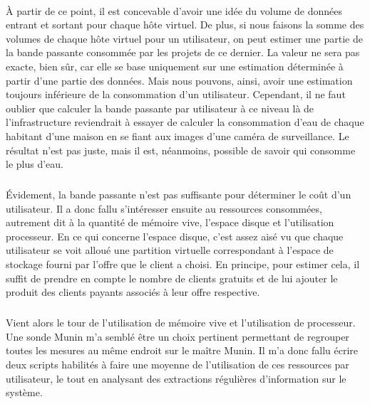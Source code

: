 \documentclass[11pt, a4paper ]{article}
\begin{document}
\begin{spacing}{1.5}
\paragraph{}
À partir de ce point, il est concevable d'avoir une idée du volume de données entrant et sortant pour chaque hôte virtuel. De plus, si nous faisons la somme des volumes de chaque hôte virtuel pour un utilisateur, on peut estimer une partie de la bande passante consommée par les projets de ce dernier. La valeur ne sera pas exacte, bien sûr, car elle se base uniquement sur une estimation déterminée à partir d'une partie des données. Mais nous pouvons, ainsi, avoir une estimation toujours inférieure de la consommation d'un utilisateur. Cependant, il ne faut oublier que calculer la bande passante par utilisateur à ce niveau là de l'infrastructure reviendrait à essayer de calculer la consommation d'eau de chaque habitant d'une maison en se fiant aux images d'une caméra de surveillance. Le résultat n'est pas juste, mais il est, néanmoins, possible de savoir qui consomme le plus d'eau.
\subparagraph{}
Évidement, la bande passante n'est pas suffisante pour déterminer le coût d'un utilisateur. Il a donc fallu s’intéresser ensuite au ressources consommées, autrement dit à la quantité de mémoire vive, l'espace disque et l'utilisation processeur. En ce qui concerne l'espace disque, c'est assez aisé vu que chaque utilisateur se voit alloué une partition virtuelle correspondant à l'espace de stockage fourni par l'offre que le client a choisi. En principe, pour estimer cela, il suffit de prendre en compte le nombre de clients gratuits et de lui ajouter le produit des clients payants associés à leur offre respective.
\subparagraph{}
Vient alors le tour de l'utilisation de mémoire vive et l'utilisation de processeur. Une sonde Munin m'a semblé être un choix pertinent permettant de regrouper toutes les mesures au même endroit sur le maître Munin. Il m'a donc fallu écrire deux scripts habilités à faire une moyenne de l'utilisation de ces ressources par utilisateur, le tout en analysant des extractions régulières d'information sur le système.


\end{spacing}
\end{document}
